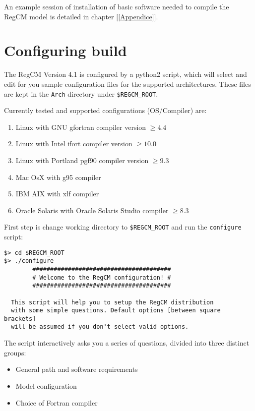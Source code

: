 An example session of installation of basic software needed to compile the
RegCM model is detailed in chapter $[$\ref{Appendice}$]$.

\section{Configuring build}

The RegCM Version 4.1 is configured by a python2 script, which will select
and edit for you sample configuration files for the supported architectures.
These files are kept in the \verb=Arch= directory under \verb=$REGCM_ROOT=.

Currently tested and supported configurations (OS/Compiler) are:

\begin{enumerate}
\item Linux with GNU gfortran compiler version $\ge 4.4$
\item Linux with Intel ifort compiler version $\ge 10.0$
\item Linux with Portland pgf90 compiler version $\ge 9.3$
\item Mac OsX with g95 compiler
\item IBM AIX with xlf compiler
\item Oracle Solaris with Oracle Solaris Studio compiler $\ge 8.3$
\end{enumerate}

First step is change working directory to \verb=$REGCM_ROOT= and run the
\verb=configure= script:

\begin{Verbatim}
$> cd $REGCM_ROOT
$> ./configure
        #######################################
        # Welcome to the RegCM configuration! #
        #######################################

  This script will help you to setup the RegCM distribution
  with some simple questions. Default options [between square brackets] 
  will be assumed if you don't select valid options.
\end{Verbatim}

The script interactively asks you a series of questions, divided into three
distinct groups:
\begin{itemize}
\item General path and software requirements
\item Model configuration
\item Choice of Fortran compiler
\end{itemize}

